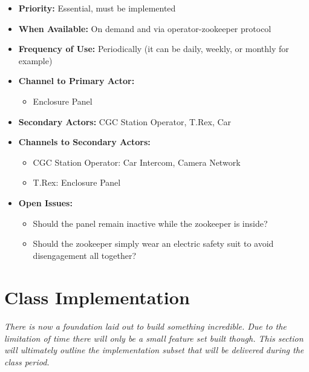 \documentclass[12pt]{article}
\begin{document}
\begin{itemize}
        \item[]\textbf{Priority:}
            Essential, must be implemented

        \item[]\textbf{When Available:}
            On demand and via operator-zookeeper protocol

        \item[]\textbf{Frequency of Use:}
            Periodically (it can be daily, weekly, or monthly for example)

        \item[]\textbf{Channel to Primary Actor:}
            \begin{itemize}
                \item[] Enclosure Panel
            \end{itemize}

        \item[]\textbf{Secondary Actors:}
            CGC Station Operator, T.Rex, Car
        
        \item[]\textbf{Channels to Secondary Actors:}
            \begin{itemize}
                \item[] CGC Station Operator: Car Intercom, Camera Network
                \item[] T.Rex: Enclosure Panel
            \end{itemize}

        \item[]\textbf{Open Issues:}
            \begin{itemize}
                \item[] Should the panel remain inactive while 
                the zookeeper is inside?
                \item[] Should the zookeeper simply wear an electric 
                safety suit to avoid disengagement all together?
            \end{itemize}
    \end{itemize}
    


\section{Class Implementation} \label{impl}
\paragraph{} \textit{There is now a foundation laid out to build something incredible. 
Due to the limitation of time there will only be a small feature set built though. This section will 
ultimately outline the implementation subset that will be delivered during the class period.}
\end{document}
